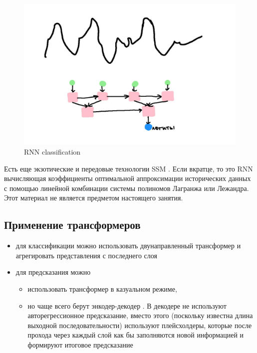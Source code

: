 \documentclass[12pt,fleqn]{article}
\begin{document}
\begin{figure}[!htb]
\begin{minipage}{0.45\linewidth}
        \includegraphics[width=\linewidth]{illustrations/rnn-clf-2.jpg}
        \caption{RNN classification}
        \label{fig:rnn-classification2}
    \end{minipage}
\end{figure}

Есть еще экзотические и передовые технологии SSM \cite{ssm}. Если вкратце, то это RNN вычисляющая коэффициенты оптимальной аппроксимации исторических данных с помощью линейной комбинации системы полиномов Лагранжа или Лежандра. Этот материал не является предметом настоящего занятия.

\subsection{Применение трансформеров}

\begin{itemize}
    \item для классификации можно использовать двунаправленный трансформер и агрегировать представления с последнего слоя
    \item для предсказания можно
    \begin{itemize}
        \item использовать трансформер в казуальном режиме,
        \item но чаще всего берут энкодер-декодер \cite{informer, nst}. В декодере не используют авторегрессионное предсказание, вместо этого (поскольку известна длина выходной последовательности) используют плейсхолдеры, которые после прохода через каждый слой как бы заполняются новой информацией и формируют итоговое предсказание
    \end{itemize}
\end{itemize}
\end{document}

